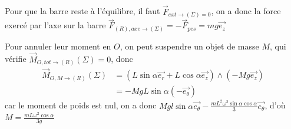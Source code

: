 \documentclass[a4paper,12pt]{book}
\begin{document}

\subsection{}
Pour que la barre reste à l'équilibre, il faut $\vec{F}_{ext \to (\Sigma)=0}$, on a donc la force 
exercé par l'axe sur la barre $\boxed{\vec{F}_{(R),axe \to (\Sigma)}=-\vec{F}_{pes}=mg\vec{e_z}}$

Pour annuler leur moment en $O$, on peut suspendre un objet de masse $M$, qui vérifie $\vec{M}_{O,tot \to (R)}(\Sigma)=0$, donc 
\begin{align*}
\vec{M}_{O,M \to (R)}(\Sigma)&=(L\sin\alpha \vec{e_r}+L\cos\alpha\vec{e_z})\wedge(-Mg\vec{e_z})\\
&=-MgL\sin\alpha(-\vec{e_\theta})
\end{align*}
car le moment de poids est nul, on a donc $Mgl \sin{\alpha}\vec{e_\theta}-\frac{mL^2\omega^2\sin\alpha\cos\alpha}{3} \vec{e_\theta}$, 
d'où $\boxed{M=\frac{mL\omega^2\cos\alpha}{3g}}$
\end{document}
